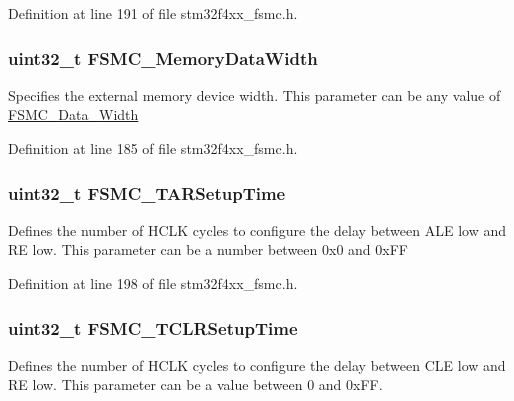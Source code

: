 Definition at line 191 of file stm32f4xx\-\_\-fsmc.\-h.

\hypertarget{struct_f_s_m_c___n_a_n_d_init_type_def_aa89fb8c812e5ef7800eef9574dcb972d}{
\subsubsection[{F\-S\-M\-C\-\_\-\-Memory\-Data\-Width}]{\setlength{\rightskip}{0pt plus 5cm}uint32\-\_\-t F\-S\-M\-C\-\_\-\-Memory\-Data\-Width}}\label{struct_f_s_m_c___n_a_n_d_init_type_def_aa89fb8c812e5ef7800eef9574dcb972d}
Specifies the external memory device width. This parameter can be any value of \hyperlink{group___f_s_m_c___data___width}{F\-S\-M\-C\-\_\-\-Data\-\_\-\-Width} 

Definition at line 185 of file stm32f4xx\-\_\-fsmc.\-h.

\hypertarget{struct_f_s_m_c___n_a_n_d_init_type_def_ab1fc3b07b6286b4974690191231f2773}{
\subsubsection[{F\-S\-M\-C\-\_\-\-T\-A\-R\-Setup\-Time}]{\setlength{\rightskip}{0pt plus 5cm}uint32\-\_\-t F\-S\-M\-C\-\_\-\-T\-A\-R\-Setup\-Time}}\label{struct_f_s_m_c___n_a_n_d_init_type_def_ab1fc3b07b6286b4974690191231f2773}
Defines the number of H\-C\-L\-K cycles to configure the delay between A\-L\-E low and R\-E low. This parameter can be a number between 0x0 and 0x\-F\-F 

Definition at line 198 of file stm32f4xx\-\_\-fsmc.\-h.

\hypertarget{struct_f_s_m_c___n_a_n_d_init_type_def_ab9fd4e9d4db1fc098d5f4ccffb80bf61}{
\subsubsection[{F\-S\-M\-C\-\_\-\-T\-C\-L\-R\-Setup\-Time}]{\setlength{\rightskip}{0pt plus 5cm}uint32\-\_\-t F\-S\-M\-C\-\_\-\-T\-C\-L\-R\-Setup\-Time}}\label{struct_f_s_m_c___n_a_n_d_init_type_def_ab9fd4e9d4db1fc098d5f4ccffb80bf61}
Defines the number of H\-C\-L\-K cycles to configure the delay between C\-L\-E low and R\-E low. This parameter can be a value between 0 and 0x\-F\-F. 

